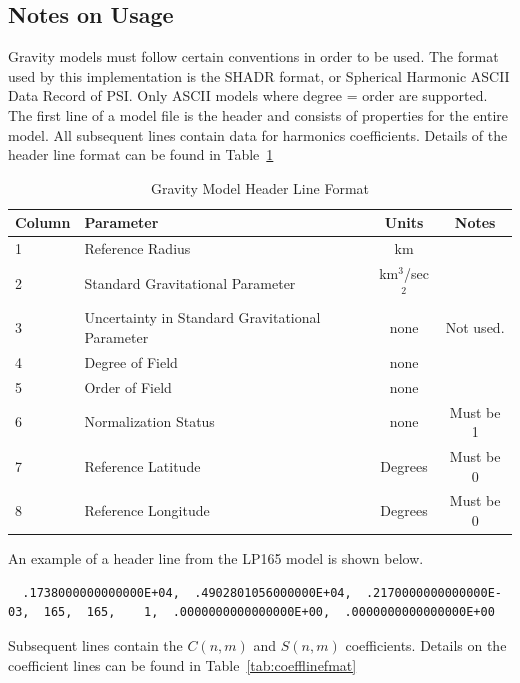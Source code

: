\documentclass[a4paper]{article}
\begin{document}
\subsection{Notes on Usage}
Gravity models must follow certain conventions in order to be used. The format used by this implementation is the SHADR format, or Spherical Harmonic ASCII Data Record of PSI\cite{shadr}. Only ASCII models where degree = order are supported.
The first line of a model file is the header and consists of properties for the entire model. All subsequent lines contain data for harmonics coefficients. Details of the header line format can be found in Table~\ref{tab:headlinefmat}
\begin{table}[h]
\begin{tabular}{llcc}
Column	&Parameter                        				&Units      			& Notes     \\\hline
1		&Reference Radius                 				&km         			&           \\
2		&Standard Gravitational Parameter 			&km$^3$/sec$^2$ 	&           \\
3		&Uncertainty in Standard Gravitational Parameter	&none           		& Not used. \\
4		&Degree of Field						&none           		&		\\
5		&Order of Field						&none				&		\\
6		&Normalization Status					&none				&Must be 1	\\
7		&Reference Latitude					&Degrees			&Must be 0	\\
8		&Reference Longitude					&Degrees			&Must be 0	
\end{tabular}
\caption{Gravity Model Header Line Format}
\label{tab:headlinefmat}
\end{table}


An example of a header line from the LP165 model is shown below.
\begin{tiny}
\begin{verbatim}
  .1738000000000000E+04,  .4902801056000000E+04,  .2170000000000000E-03,  165,  165,    1,  .0000000000000000E+00,  .0000000000000000E+00   
\end{verbatim}
\end{tiny}

Subsequent lines contain the $C(n,m)$ and $S(n,m)$ coefficients. Details on the coefficient lines can be found in Table~\ref{tab:coefflinefmat}
\end{document}
